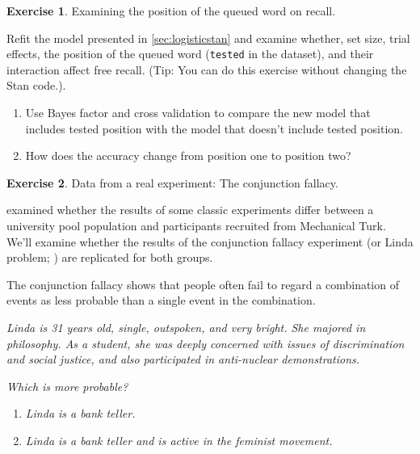 \documentclass[12pt,]{krantz}
\providecommand{\tightlist}{%
  \setlength{\itemsep}{0pt}\setlength{\parskip}{0pt}}
\theoremstyle{definition}
\theoremstyle{definition}
\theoremstyle{definition}
\newtheorem{exercise}{Exercise}[chapter]
\theoremstyle{remark}
\begin{document}
\begin{exercise}
\protect\hypertarget{exr:logisticstan}{}{\label{exr:logisticstan} }Examining
the position of the queued word on recall. \end{exercise}

Refit the model presented in \ref{sec:logisticstan} and examine whether,
set size, trial effects, the position of the queued word
(\texttt{tested} in the dataset), and their interaction affect free
recall. (Tip: You can do this exercise without changing the Stan code.).

\begin{enumerate}
\def\labelenumi{\alph{enumi}.}
\tightlist
\item
  Use Bayes factor and cross validation to compare the new model that
  includes tested position with the model that doesn't include tested
  position.
\item
  How does the accuracy change from position one to position two?
\end{enumerate}

\begin{exercise}
\protect\hypertarget{exr:fallacy}{}{\label{exr:fallacy} }Data from a real
experiment: The conjunction fallacy. \end{exercise}

\citet{Paolaccietal} examined whether the results of some classic
experiments differ between a university pool population and participants
recruited from Mechanical Turk. We'll examine whether the results of the
conjunction fallacy experiment (or Linda problem;
\citet{TverskyKahneman1983}) are replicated for both groups.

The conjunction fallacy shows that people often fail to regard a
combination of events as less probable than a single event in the
combination. \citet{TverskyKahneman1983}

\emph{Linda is 31 years old, single, outspoken, and very bright. She
majored in philosophy. As a student, she was deeply concerned with
issues of discrimination and social justice, and also participated in
anti-nuclear demonstrations.}

\emph{Which is more probable?}

\begin{enumerate}
\def\labelenumi{\alph{enumi}.}
\tightlist
\item
  \emph{Linda is a bank teller.}
\item
  \emph{Linda is a bank teller and is active in the feminist movement.}
\end{enumerate}
\end{document}
